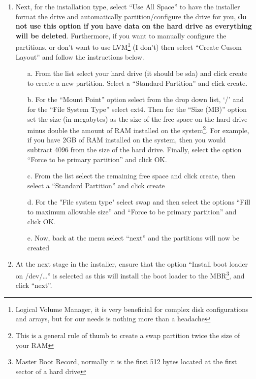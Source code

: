 \begin{enumerate}
\item	Next, for the installation type, select ``Use All Space'' to have the installer format the drive and automatically partition/configure
		the drive for you, {\bf do not use this option if you have data on the hard drive as everything will be deleted}. Furthermore, if you
		want to manually configure the partitions, or don't want to use LVM\footnote{Logical Volume Manager, it is very beneficial for complex
		disk configurations and arrays, but for our needs is nothing more than a headache} (I don't) then select ``Create Cusom Layout''
		and follow the instructions below.
		
\begin{itemize}
\label{sec:rhmanualdrive}
\item[a.]	From the list select your hard drive (it should be sda) and click create to create a new partition. Select a ``Standard Partition''
			and click create.

\item[b.]	For the ``Mount Point'' option select from the drop down list, `/' and for the ``File System Type'' select ext4. Then for the 
			``Size (MB)'' option set the size (in megabytes) as the size of the free space on the hard drive minus double the amount of RAM 
			installed on the system\footnote{This is a general rule of thumb to create a swap partition twice the size of your RAM}. For 
			example, if you	have 2GB of RAM installed on the system, then you would subtract 4096 from the size of the hard drive. 
			Finally, select the option ``Force to be primary partition'' and click OK.

\item[c.]	From the list select the remaining free space and click create, then select a ``Standard Partition'' and click create

\item[d.]	For the "File system type" select swap and then select the options ``Fill to maximum allowable size'' and ``Force to be primary
			partition'' and click OK.
			
\item[e.]	Now, back at the menu select ``next'' and the partitions will now be created
\end{itemize}

\item	At the next stage in the installer, ensure that the option ``Install boot loader on /dev/\ldots'' is selected as this will install
		the boot loader to the MBR\footnote{Master Boot Record, normally it is the first 512 bytes located at the first sector of a hard 
		drive}, and click ``next''.
		

\end{enumerate}
